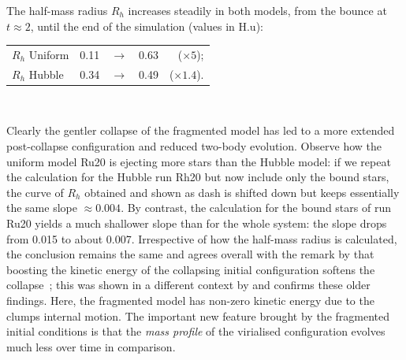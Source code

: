 The half-mass radius $R_h$ increases steadily in both models, from the bounce at $t \approx 2$, until the end of the simulation (values in H.u):  
\begin{center}
\begin{tabular}{lllrr}
$R_h$ Uniform & 0.11 &  $\rightarrow$ & 0.63 & ($\times 5$); \\
$R_h$ Hubble & 0.34  &  $\rightarrow$ & 0.49 & ($\times 1.4$). \\
\end{tabular}\\
\end{center}

%
Clearly the gentler collapse of the fragmented model has led to a more extended post-collapse configuration and reduced two-body evolution. Observe how the uniform model Ru20 is ejecting more stars than the Hubble model: if we repeat the calculation for the Hubble run Rh20 but now include only the bound stars, the curve of $R_h$ obtained and shown as dash is shifted down but keeps essentially the same slope $\approx  0.004$. By contrast, the calculation for the bound stars of run Ru20 yields a much shallower slope than for the whole system: the slope drops from 0.015 to about 0.007. Irrespective of how the half-mass radius is calculated, the conclusion remains the same and agrees overall with the remark by \cite{Caputo2014} that boosting the kinetic energy of the collapsing initial configuration softens the collapse~; this was shown in a different context by \cite{Theis1999} and confirms these older findings.  Here, the fragmented model has non-zero kinetic energy due to the clumps internal motion. The important new feature brought by the fragmented initial conditions is that the {\it mass profile} of the virialised configuration evolves much less over time in comparison. 



